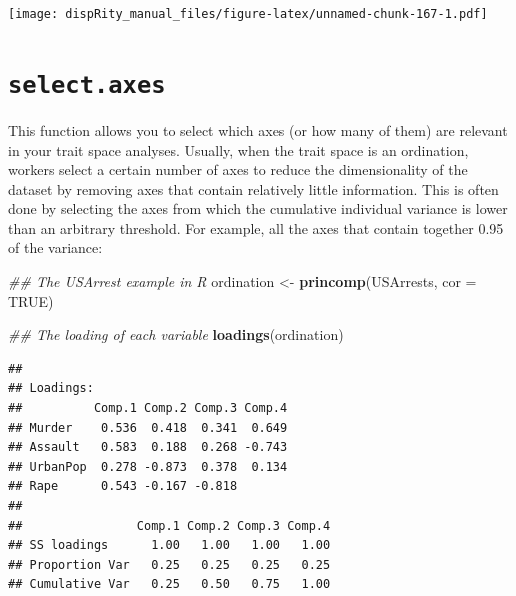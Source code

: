 \documentclass[
]{book}
\newenvironment{Shaded}{\begin{snugshade}}{\end{snugshade}}
\newcommand{\CommentTok}[1]{\textcolor[rgb]{0.56,0.35,0.01}{\textit{#1}}}
\newcommand{\DataTypeTok}[1]{\textcolor[rgb]{0.13,0.29,0.53}{#1}}
\newcommand{\DecValTok}[1]{\textcolor[rgb]{0.00,0.00,0.81}{#1}}
\newcommand{\KeywordTok}[1]{\textcolor[rgb]{0.13,0.29,0.53}{\textbf{#1}}}
\newcommand{\NormalTok}[1]{#1}
\newcommand{\OperatorTok}[1]{\textcolor[rgb]{0.81,0.36,0.00}{\textbf{#1}}}
\newcommand{\OtherTok}[1]{\textcolor[rgb]{0.56,0.35,0.01}{#1}}
\newcommand{\StringTok}[1]{\textcolor[rgb]{0.31,0.60,0.02}{#1}}
\begin{document}
\texttt{[image: dispRity\_manual\_files/figure-latex/unnamed-chunk-167-1.pdf]}

\hypertarget{select.axes}{%
\section{\texorpdfstring{\texttt{select.axes}}{select.axes}}\label{select.axes}}

This function allows you to select which axes (or how many of them) are relevant in your trait space analyses.
Usually, when the trait space is an ordination, workers select a certain number of axes to reduce the dimensionality of the dataset by removing axes that contain relatively little information.
This is often done by selecting the axes from which the cumulative individual variance is lower than an arbitrary threshold.
For example, all the axes that contain together 0.95 of the variance:

\begin{Shaded}
\begin{Highlighting}[]
\CommentTok{\#\# The USArrest example in R}
\NormalTok{ordination \textless{}{-}}\StringTok{ }\KeywordTok{princomp}\NormalTok{(USArrests, }\DataTypeTok{cor =} \OtherTok{TRUE}\NormalTok{)}

\CommentTok{\#\# The loading of each variable}
\KeywordTok{loadings}\NormalTok{(ordination)}
\end{Highlighting}
\end{Shaded}

\begin{verbatim}
## 
## Loadings:
##          Comp.1 Comp.2 Comp.3 Comp.4
## Murder    0.536  0.418  0.341  0.649
## Assault   0.583  0.188  0.268 -0.743
## UrbanPop  0.278 -0.873  0.378  0.134
## Rape      0.543 -0.167 -0.818       
## 
##                Comp.1 Comp.2 Comp.3 Comp.4
## SS loadings      1.00   1.00   1.00   1.00
## Proportion Var   0.25   0.25   0.25   0.25
## Cumulative Var   0.25   0.50   0.75   1.00
\end{verbatim}

\begin{Shaded}
\end{Shaded}
\end{document}
